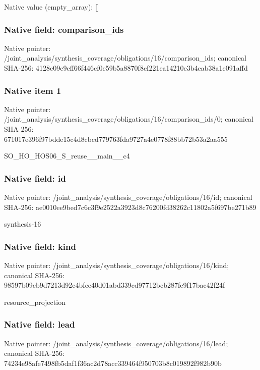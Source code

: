 \documentclass[10pt,a4paper]{article}
\begin{document}
Native value (empty\_\allowbreak{}array): []

\subsubsection{Native field: comparison\_\allowbreak{}ids}
Native pointer: /joint\_\allowbreak{}analysis/synthesis\_\allowbreak{}coverage/obligations/16/comparison\_\allowbreak{}ids; canonical SHA-256: 4128c09e9eff66f446cf0e59b5a8870f8cf221ea14210e3b4eab38a1e091affd

\subsubsection{Native item 1}
Native pointer: /joint\_\allowbreak{}analysis/synthesis\_\allowbreak{}coverage/obligations/16/comparison\_\allowbreak{}ids/0; canonical SHA-256: 671017e396f97bdde15c4d8cbcd779763fda9727a4e0778f88bb72b53a2aa555

\begingroup\raggedright\sloppy SO\_\allowbreak{}HO\_\allowbreak{}HOS06\_\allowbreak{}S\_\allowbreak{}reuse\_\allowbreak{}\_\allowbreak{}main\_\allowbreak{}\_\allowbreak{}c4\par\endgroup

\subsubsection{Native field: id}
Native pointer: /joint\_\allowbreak{}analysis/synthesis\_\allowbreak{}coverage/obligations/16/id; canonical SHA-256: ae0010ee9bed7c6c3f9e2522a3923d8c76200fd38262c11802a5f697be271b89

\begingroup\raggedright\sloppy synthesis-16\par\endgroup

\subsubsection{Native field: kind}
Native pointer: /joint\_\allowbreak{}analysis/synthesis\_\allowbreak{}coverage/obligations/16/kind; canonical SHA-256: 98597b09cb9d7213d92c4bfee40d01abd339cd97712bcb287fe9f17bac42f24f

\begingroup\raggedright\sloppy resource\_\allowbreak{}projection\par\endgroup

\subsubsection{Native field: lead}
Native pointer: /joint\_\allowbreak{}analysis/synthesis\_\allowbreak{}coverage/obligations/16/lead; canonical SHA-256: 74234e98afe7498fb5daf1f36ac2d78acc339464f950703b8c019892f982b90b
\end{document}
